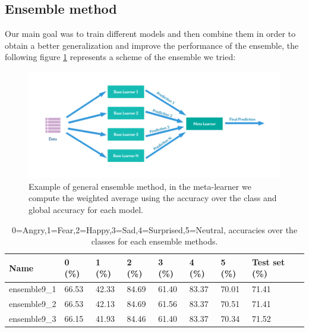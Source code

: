 \documentclass[10pt,twocolumn,letterpaper]{article}
\begin{document}
\subsection{Ensemble method}
\label{subsection:ensemble}
Our main goal was to train different models and then combine them in order to obtain a better generalization and improve the performance of the ensemble, the following figure \ref{figure:ensemblescheme} represents a scheme of the ensemble we tried:
\begin{figure}[H]
   \centering
   \includegraphics[width=1\linewidth]{./immagini/ensemble.png}
   \caption{Example of general ensemble method, in the meta-learner we compute the weighted average using the accuracy over the class and global accuracy for each model.}
   \label{figure:ensemblescheme}
\end{figure}
\def\arraystretch{1.2}
\begin{table}[H]
   \scriptsize
   \begin{tabular}{L{1.1cm}C{0.5cm}C{0.5cm}C{0.5cm}C{0.5cm}C{0.5cm}C{0.5cm}C{0.8cm}}
      \hline
      Name         & 0 (\%) & 1 (\%) & 2 (\%) & 3 (\%) & 4 (\%) & 5 (\%) & Test set (\%) \\
      \hline\hline
      ensemble9\_1 & 66.53  & 42.33  & 84.69  & 61.40  & 83.37  & 70.01  & 71.41         \\
      ensemble9\_2 & 66.53  & 42.13  & 84.69  & 61.56  & 83.37  & 70.51  & 71.41         \\
      ensemble9\_3 & 66.15  & 41.93  & 84.46  & 61.40  & 83.37  & 70.34  & 71.52         \\

      \hline
   \end{tabular}
   \caption{ 0=Angry,1=Fear,2=Happy,3=Sad,4=Surprised,5=Neutral, accuracies over the classes for each ensemble methods.}
   \label{table:accuracyensemble9}
\end{table}
\end{document}
